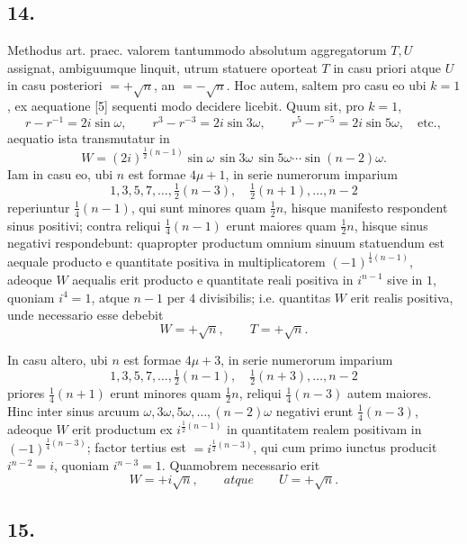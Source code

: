 \documentclass[12pt]{article}
\begin{document}
\subsection*{14.}

Methodus art. praec. valorem tantummodo absolutum aggregatorum $T,U$ assignat, ambiguumque linquit, utrum statuere oporteat $T$ in casu priori atque $U$ in casu posteriori $=+\sqrt n$, an $=-\sqrt n$. Hoc autem, saltem pro casu eo ubi $k=1$, ex aequatione [5] sequenti modo decidere licebit. Quum sit, pro $k=1$,
\[
r-r^{-1}=2i\sin\omega,\qquad
r^3-r^{-3}=2i\sin3\omega,\qquad
r^5-r^{-5}=2i\sin5\omega,\quad\text{etc.},
\]
aequatio ista transmutatur in
\[
W=(2i)^{\frac12(n-1)}\sin\omega\,\sin3\omega\,\sin5\omega\cdots\sin(n-2)\omega.
\]
Iam in casu eo, ubi $n$ est formae $4\mu+1$, in serie numerorum imparium
\[
1,3,5,7,\ldots,\tfrac12(n-3),\quad \tfrac12(n+1),\ldots,n-2
\]
reperiuntur $\tfrac14(n-1)$, qui sunt minores quam $\tfrac12 n$, hisque manifesto respondent sinus positivi; contra reliqui $\tfrac14(n-1)$ erunt maiores quam $\tfrac12 n$, hisque sinus negativi respondebunt: quapropter productum omnium sinuum statuendum est aequale producto e quantitate positiva in multiplicatorem $(-1)^{\frac14(n-1)}$, adeoque $W$ aequalis erit producto e quantitate reali positiva in $i^{n-1}$ sive in $1$, quoniam $i^4=1$, atque $n-1$ per $4$ divisibilis; i.e. quantitas $W$ erit realis positiva, unde necessario esse debebit
\[
W=+\sqrt n,\qquad T=+\sqrt n.
\]

In casu altero, ubi $n$ est formae $4\mu+3$, in serie numerorum imparium
\[
1,3,5,7,\ldots,\tfrac12(n-1),\quad \tfrac12(n+3),\ldots,n-2
\]
priores $\tfrac14(n+1)$ erunt minores quam $\tfrac12 n$, reliqui $\tfrac14(n-3)$ autem maiores. Hinc inter sinus arcuum $\omega,3\omega,5\omega,\ldots,(n-2)\omega$ negativi erunt $\tfrac14(n-3)$, adeoque $W$ erit productum ex $i^{\frac12(n-1)}$ in quantitatem realem positivam in $(-1)^{\frac14(n-3)}$; factor tertius est $=i^{\frac12(n-3)}$, qui cum primo iunctus producit $i^{n-2}=i$, quoniam $i^{n-3}=1$. Quamobrem necessario erit
\[
W=+i\sqrt n,\qquad atque\qquad U=+\sqrt n.
\]

\subsection*{15.}
\end{document}
